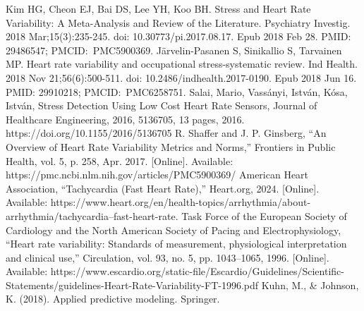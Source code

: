 \documentclass[conference]{IEEEtran}
\begin{document}
\begin{thebibliography}{00}
 Kim HG, Cheon EJ, Bai DS, Lee YH, Koo BH. Stress and Heart Rate Variability: A Meta-Analysis and Review of the Literature. Psychiatry Investig. 2018 Mar;15(3):235-245. doi: 10.30773/pi.2017.08.17. Epub 2018 Feb 28. PMID: 29486547; PMCID: PMC5900369.
 Järvelin-Pasanen S, Sinikallio S, Tarvainen MP. Heart rate variability and occupational stress-systematic review. Ind Health. 2018 Nov 21;56(6):500-511. doi: 10.2486/indhealth.2017-0190. Epub 2018 Jun 16. PMID: 29910218; PMCID: PMC6258751.
 Salai, Mario, Vassányi, István, Kósa, István, Stress Detection Using Low Cost Heart Rate Sensors, Journal of Healthcare Engineering, 2016, 5136705, 13 pages, 2016. https://doi.org/10.1155/2016/5136705 
 R. Shaffer and J. P. Ginsberg, “An Overview of Heart Rate Variability Metrics and Norms,” Frontiers in Public Health, vol. 5, p. 258, Apr. 2017. [Online]. Available: https://pmc.ncbi.nlm.nih.gov/articles/PMC5900369/
 American Heart Association, “Tachycardia (Fast Heart Rate),” Heart.org, 2024. [Online]. Available: https://www.heart.org/en/health-topics/arrhythmia/about-arrhythmia/tachycardia--fast-heart-rate.
 Task Force of the European Society of Cardiology and the North American Society of Pacing and Electrophysiology, “Heart rate variability: Standards of measurement, physiological interpretation and clinical use,” Circulation, vol. 93, no. 5, pp. 1043–1065, 1996. [Online]. Available: https://www.escardio.org/static-file/Escardio/Guidelines/Scientific-Statements/guidelines-Heart-Rate-Variability-FT-1996.pdf
 Kuhn, M., \& Johnson, K. (2018). Applied predictive modeling. Springer.
\end{thebibliography}
\end{document}
